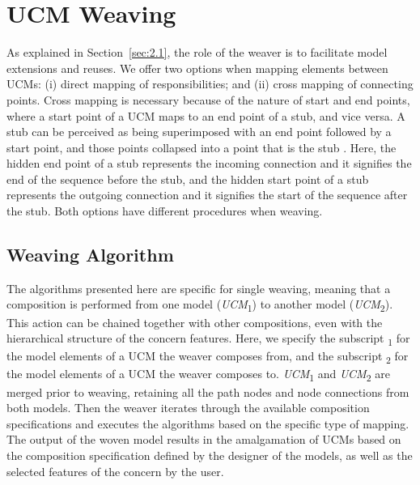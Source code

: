 
\section{UCM Weaving} \label{sec:3.2}

As explained in Section~\ref{sec:2.1}, the role of the weaver is to facilitate model extensions and reuses. We offer two options when mapping elements between UCMs: (i) direct mapping of responsibilities; and (ii) cross mapping of connecting points. Cross mapping is necessary because of the nature of start and end points, where a start point of a UCM maps to an end point of a stub, and vice versa. A stub can be perceived as being superimposed with an end point followed by a start point, and those points collapsed into a point that is the stub \cite{buhr1995use}. Here, the hidden end point of a stub represents the incoming connection and it signifies the end of the sequence before the stub, and the hidden start point of a stub represents the outgoing connection and it signifies the start of the sequence after the stub. Both options have different procedures when weaving.

\subsection{Weaving Algorithm}

The algorithms presented here are specific for single weaving, meaning that a composition is performed from one model (\emph{UCM}\textsubscript{1}) to another model (\emph{UCM}\textsubscript{2}). This action can be chained together with other compositions, even with the hierarchical structure of the concern features. Here, we specify the subscript \textsubscript{1} for the model elements of a UCM the weaver composes from, and the subscript \textsubscript{2} for the model elements of a UCM the weaver composes to. \emph{UCM}\textsubscript{1} and \emph{UCM}\textsubscript{2} are merged prior to weaving, retaining all the path nodes and node connections from both models. Then the weaver iterates through the available composition specifications and executes the algorithms based on the specific type of mapping. The output of the woven model results in the amalgamation of UCMs based on the composition specification defined by the designer of the models, as well as the selected features of the concern by the user.

